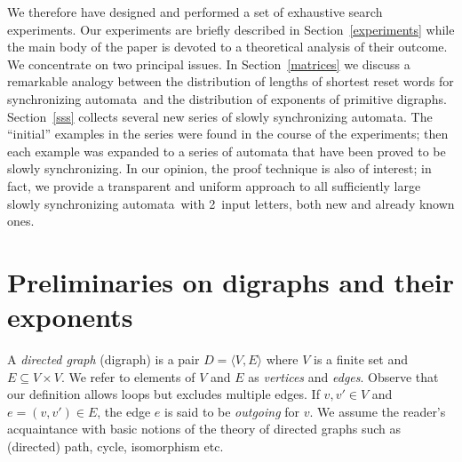 \documentclass[11pt]{llncs}
\newcommand{\sa}{synchronizing automata}
\begin{document}
We therefore have designed and performed a set of exhaustive search
experiments. Our experiments are briefly described in Section~\ref{experiments}
while the main body of the paper is devoted to a theoretical analysis
of their outcome. We concentrate on two principal issues. In Section~\ref{matrices}
we discuss a remarkable analogy between the distribution of lengths of shortest
reset words for \sa\ and the distribution of exponents of primitive digraphs.
Section~\ref{sss} collects several new series of slowly \sa. The ``initial''
examples in the series were found in the course of the experiments; then
each example was expanded to a series of automata that have been proved
to be slowly synchronizing. In our opinion, the proof technique is also
of interest; in fact, we provide a transparent and uniform approach to all
sufficiently large slowly \sa\ with 2~input letters, both new and already
known ones.

\section{Preliminaries on digraphs and their exponents}
\label{preliminaries}

A \emph{directed graph} (digraph) is a pair $D=\langle V,E\rangle$ where $V$ is
a finite set and $E\subseteq V\times V$. We refer to elements of $V$ and $E$ as
\emph{vertices} and \emph{edges}. Observe that our definition allows loops but
excludes multiple edges. If $v,v'\in V$ and $e=(v,v')\in E$, the edge $e$ is said
to be \emph{outgoing} for $v$. We assume the reader's acquaintance with basic
notions of the theory of directed graphs such as (directed) path, cycle,
isomorphism etc.
\end{document}
